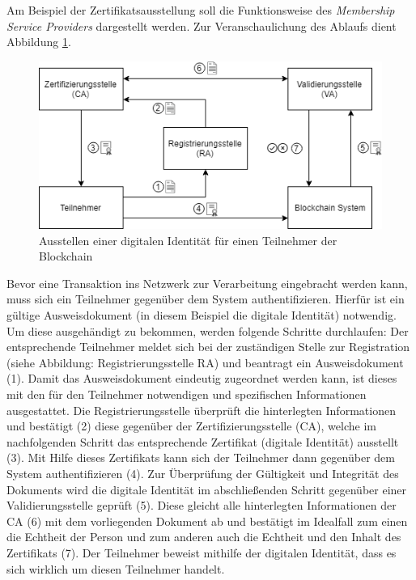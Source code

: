 Am Beispiel der Zertifikatsausstellung soll die Funktionsweise des \textit{Membership Service Providers} dargestellt werden. Zur Veranschaulichung des Ablaufs dient Abbildung \ref{fig:hyperledger-fabric-membership-blockchain}.

\begin{figure}[H]
	\centering
	\includegraphics[width=1\linewidth]{pictures/digital-identity-issue}
	\caption[Ausstellen einer digitalen Identität für einen Teilnehmer der Blockchain]{Ausstellen einer digitalen Identität für einen Teilnehmer der Blockchain}
	\label{fig:hyperledger-fabric-membership-blockchain}
\end{figure}

Bevor eine Transaktion ins Netzwerk zur Verarbeitung eingebracht werden kann, muss sich ein Teilnehmer gegenüber dem System authentifizieren. Hierfür ist ein gültige Ausweisdokument (in diesem Beispiel die digitale Identität) notwendig. Um diese ausgehändigt zu bekommen, werden folgende Schritte durchlaufen: Der entsprechende Teilnehmer meldet sich bei der zuständigen Stelle zur Registration (siehe Abbildung: Registrierungsstelle RA) und beantragt ein Ausweisdokument (1). Damit das Ausweisdokument eindeutig zugeordnet werden kann, ist dieses mit den für den Teilnehmer notwendigen und spezifischen Informationen ausgestattet. Die Registrierungsstelle überprüft die hinterlegten Informationen und bestätigt (2) diese gegenüber der Zertifizierungsstelle (CA), welche im nachfolgenden Schritt das entsprechende Zertifikat (digitale Identität) ausstellt (3). Mit Hilfe dieses Zertifikats kann sich der Teilnehmer dann gegenüber dem System authentifizieren (4). Zur Überprüfung der Gültigkeit und Integrität des Dokuments wird die digitale Identität im abschließenden Schritt gegenüber einer Validierungsstelle geprüft (5). Diese gleicht alle hinterlegten Informationen der CA (6) mit dem vorliegenden Dokument ab und bestätigt im Idealfall zum einen die Echtheit der Person und zum anderen auch die Echtheit und den Inhalt des Zertifikats (7). Der Teilnehmer beweist mithilfe der digitalen Identität, dass es sich wirklich um diesen Teilnehmer handelt.

